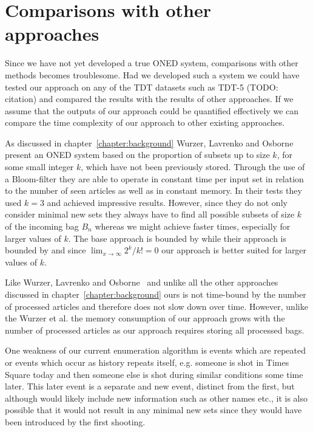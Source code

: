 \section{Comparisons with other approaches}
Since we have not yet developed a true ONED system, comparisons with other methods becomes troublesome. Had we developed such a system we could have tested our approach on any of the TDT datasets such as TDT-5 (TODO: citation) and compared the results with the results of other approaches. If we assume that the outputs of our approach could be quantified effectively we can compare the time complexity of our approach to other existing approaches.

As discussed in chapter~\ref{chapter:background} Wurzer, Lavrenko and Osborne~\cite{wurzer2015kterm} present an ONED system based on the proportion of subsets up to size $k$, for some small integer $k$, which have not been previously stored. Through the use of a Bloom-filter they are able to operate in constant time per input set in relation to the number of seen articles as well as in constant memory. In their tests they used $k=3$ and achieved impressive results. However, since they do not only consider minimal new sets they always have to find all possible subsets of size $k$ of the incoming bag $B_{n}$ whereas we might achieve faster times, especially for larger values of $k$. The base approach is bounded by  while their approach is bounded by  and since $\lim_{x \to \infty}2^{k}/k!=0$ our approach is better suited for larger values of $k$. 

Like Wurzer, Lavrenko and Osborne~\cite{wurzer2015kterm} and unlike all the other approaches discussed in chapter~\ref{chapter:background} ours is not time-bound by the number of processed articles and therefore does not slow down over time. However, unlike the Wurzer et al. the memory consumption of our approach grows with the number of processed articles as our approach requires storing all processed bags. 

One weakness of our current enumeration algorithm is events which are repeated or events which occur as history repeats itself, e.g. someone is shot in Times Square today and then someone else is shot during similar conditions some time later. This later event is a separate and new event, distinct from the first, but although would likely include new information such as other names etc., it is also possible that it would not result in any minimal new sets since they would have been introduced by the first shooting.

